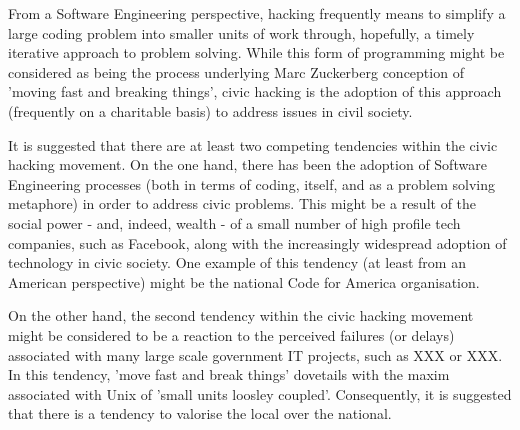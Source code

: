 From a Software Engineering perspective, hacking frequently means to simplify a large coding problem into smaller units of work through, hopefully, a timely iterative approach to problem solving.
While this form of programming might be considered as being the process underlying Marc Zuckerberg conception of 'moving fast and breaking things',
civic hacking is the adoption of this approach (frequently on a charitable basis) to address issues in civil society.

It is suggested that there are at least two competing tendencies within the civic hacking movement.
On the one hand, there has been the adoption of Software Engineering processes (both in terms of coding, itself, and as a problem solving metaphore) in order to address civic problems. 
This might be a result of the social power - and, indeed, wealth - of a small number of high profile tech companies, such as Facebook, along with the increasingly widespread adoption of technology in civic society.
One example of this tendency (at least from an American perspective) might be the national Code for America organisation.

On the other hand, the second tendency within the civic hacking movement might be considered to be a reaction to the perceived failures (or delays) associated with many large scale government IT projects, such as XXX or XXX.
In this tendency, 'move fast and break things' dovetails with the maxim associated with Unix of 'small units loosley coupled'.
Consequently, it is suggested that there is a tendency to valorise the local over the national.

